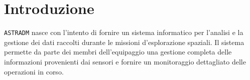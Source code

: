 \chapter{Introduzione}
\texttt{ASTRADM} nasce con l'intento di fornire un sistema informatico
per l'analisi e la gestione dei dati raccolti durante le missioni
d'esplorazione spaziali.  Il sistema permette da parte dei membri
dell'equipaggio una gestione completa delle informazioni provenienti
dai sensori e fornire un monitoraggio dettagliato delle operazioni in
corso.








